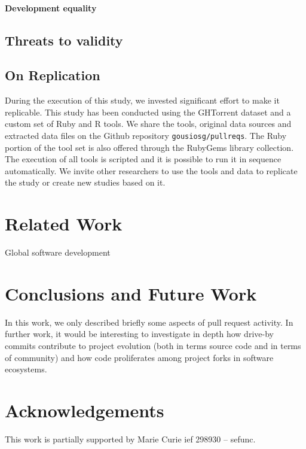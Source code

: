 \documentclass{sig-alternate}
\begin{document}
\paragraph{Development equality}

\subsection{Threats to validity}

\subsection{On Replication}

During the execution of this study, we invested significant effort to
make it replicable.  This study has been conducted using the GHTorrent dataset
and a custom set of Ruby and R tools. We share the tools, original data sources
and extracted data files on the Github repository \texttt{gousiosg/pullreqs}.
The Ruby portion of the tool set is also offered through the RubyGems library
collection. The execution of all tools is scripted and it is possible to run it
in sequence automatically. We invite other researchers to use the tools and data
to replicate the study or create new studies based on it.

\section{Related Work}

\cite{Bird09}
\cite{Cornf10}
\cite{Dabbi12}
\cite{Bird12}
\cite{Barr12}
\cite{Buffe99}
\cite{Mens02}
\cite{Shiha12}

Global software development
\section{Conclusions and Future Work}

In this work, we only described briefly some aspects of pull request activity.
In further work, it would be interesting to investigate in depth how drive-by
commits contribute to project evolution (both in terms source code and in
terms of community) and how code proliferates among project
forks in software ecosystems.

\section*{Acknowledgements}

This work is partially supported by Marie Curie {\sc ief} 298930 -- {\sc sefunc}.



\end{document}
